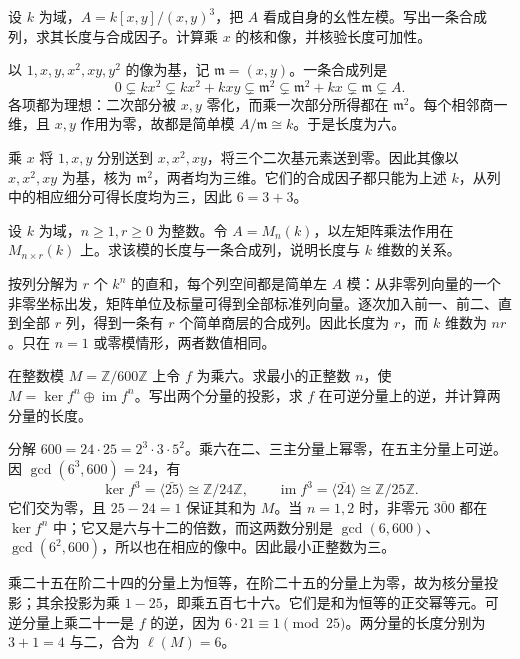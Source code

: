 \begin{exercise}\label{b2:ex:12-truncated-polynomial-length}
	设 \(k\) 为域，\(A=k[x,y]/(x,y)^3\)，把 \(A\) 看成自身的幺性左模。写出一条合成列，求其长度与合成因子。计算乘 \(x\) 的核和像，并核验长度可加性。
\end{exercise}
\begin{solution}
	以 \(1,x,y,x^2,xy,y^2\) 的像为基，记 \(\mathfrak m=(x,y)\)。一条合成列是
	\[
		0\subsetneq kx^2\subsetneq kx^2+kxy\subsetneq\mathfrak m^2 \subsetneq\mathfrak m^2+kx\subsetneq\mathfrak m\subsetneq A.
	\]
	各项都为理想：二次部分被 \(x,y\) 零化，而乘一次部分所得都在 \(\mathfrak m^2\)。每个相邻商一维，且 \(x,y\) 作用为零，故都是简单模 \(A/\mathfrak m\cong k\)。于是长度为六。

	乘 \(x\) 将 \(1,x,y\) 分别送到 \(x,x^2,xy\)，将三个二次基元素送到零。因此其像以 \(x,x^2,xy\) 为基，核为 \(\mathfrak m^2\)，两者均为三维。它们的合成因子都只能为上述 \(k\)，从列中的相应细分可得长度均为三，因此 \(6=3+3\)。
\end{solution}

\begin{exercise}\label{b2:ex:12-matrix-module-length}
	设 \(k\) 为域，\(n\ge1,r\ge0\) 为整数。令 \(A=M_n(k)\)，以左矩阵乘法作用在 \(M_{n\times r}(k)\) 上。求该模的长度与一条合成列，说明长度与 \(k\) 维数的关系。
\end{exercise}
\begin{solution}
	按列分解为 \(r\) 个 \(k^n\) 的直和，每个列空间都是简单左 \(A\) 模：从非零列向量的一个非零坐标出发，矩阵单位及标量可得到全部标准列向量。逐次加入前一、前二、直到全部 \(r\) 列，得到一条有 \(r\) 个简单商层的合成列。因此长度为 \(r\)，而 \(k\) 维数为 \(nr\)。只在 \(n=1\) 或零模情形，两者数值相同。
\end{solution}

\begin{exercise}\label{b2:ex:12-fitting-integers}
	在整数模 \(M=\mathbb Z/600\mathbb Z\) 上令 \(f\) 为乘六。求最小的正整数 \(n\)，使 \(M=\ker f^n\oplus\operatorname{im}f^n\)。写出两个分量的投影，求 \(f\) 在可逆分量上的逆，并计算两分量的长度。
\end{exercise}
\begin{solution}
	分解 \(600=24\cdot25=2^3\cdot3\cdot5^2\)。乘六在二、三主分量上幂零，在五主分量上可逆。因 \(\gcd(6^3,600)=24\)，有
	\[
		\ker f^3=\langle\bar{25}\rangle\cong\mathbb Z/24\mathbb Z, \qquad \operatorname{im}f^3=\langle\bar{24}\rangle\cong\mathbb Z/25\mathbb Z.
	\]
	它们交为零，且 \(25-24=1\) 保证其和为 \(M\)。当 \(n=1,2\) 时，非零元 \(\bar{300}\) 都在 \(\ker f^n\) 中；它又是六与十二的倍数，而这两数分别是 \(\gcd(6,600)\)、\(\gcd(6^2,600)\)，所以也在相应的像中。因此最小正整数为三。

	乘二十五在阶二十四的分量上为恒等，在阶二十五的分量上为零，故为核分量投影；其余投影为乘 \(1-25\)，即乘五百七十六。它们是和为恒等的正交幂等元。可逆分量上乘二十一是 \(f\) 的逆，因为 \(6\cdot21\equiv1\pmod{25}\)。两分量的长度分别为 \(3+1=4\) 与二，合为 \(\ell(M)=6\)。
\end{solution}

